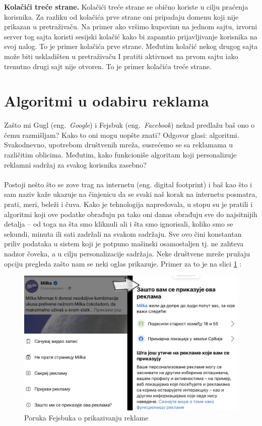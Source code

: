 \documentclass[a4paper]{article}
\begin{document}
	\textbf{Kolačići treće strane.} Kolačići treće strane se obično koriste u cilju praćenja korisnika. Za razliku od kolačića prve strane oni pripadaju domenu koji nije prikazan u pretraživaču. Na primer ako vršimo kupovinu na jednom sajtu, izvorni server tog sajta koristi sesijski kolačić kako bi zapamtio prijavljivanje korisnika na svoj nalog. To je primer kolačića prve strane. Međutim kolačić nekog drugog sajta može biti uskladišten u pretraživaču I pratiti aktivnost na prvom sajtu iako trenutno drugi sajt nije otvoren. To je primer kolačića treće strane. 
	
	\section{Algoritmi u odabiru reklama}
	\label{sec:algoritmi}
	Zašto mi Gugl (eng.~{\em Google}) i Fejsbuk (eng.~{\em Facebook}) nekad predlažu baš ono o čemu razmišljam? Kako to oni mogu uopšte znati? Odgovor glasi: algoritmi. Svakodnevno, upotrebom društvenih mreža, susrećemo se sa reklamama u različitim oblicima. Međutim, 		kako funkcioniše algoritam koji personalizuje reklamni sadržaj za svakog korisnika zasebno?\\ \\
	Postoji nešto što se zove trag na internetu (eng. digital footprint) i baš kao što i sam naziv kaže ukazuje na činjenicu da se svaki naš korak na internetu posmatra, prati, meri, beleži i čuva. Kako je tehnologija napredovala, u stopu su je pratili i algoritmi koji ove podatke 		obrađuju pa tako oni danas obrađuju sve do najsitnijih detalja – od toga na šta smo kliknuli ali i šta smo ignorisali, koliko smo se sekundi, minuta ili sati zadržali na svakom sadržaju. Sve ovo čini konstantan priliv podataka u sistem koji je potpuno mašinski osamostaljen tj. ne 		zahteva nadzor čoveka, a u cilju personalizacije sadržaja. Neke društvene mreže pružaju opciju pregleda zašto nam se neki oglas prikazuje. Primer za to je na slici \ref{fig:zastoreklama} : 
	\begin{figure}[h!]
		\begin{center}
			\includegraphics[scale=0.1]{zastoreklama.jpg}
		\end{center}
		\caption{Poruka Fejsbuka o prikazivanju reklame}
		\label{fig:zastoreklama}
	\end{figure}\\
\end{document}
